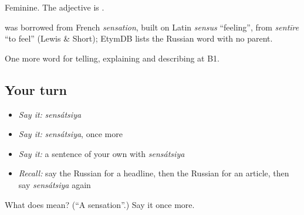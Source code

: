Feminine. The adjective is \emph{}.

\begin{cousinweb}
\emph{} was borrowed from French \emph{sensation}, built on Latin \emph{sensus} \textquotedblleft{}feeling\textquotedblright{}, from \emph{sentīre} \textquotedblleft{}to feel\textquotedblright{} (Lewis \& Short); EtymDB lists the Russian word with no parent.
\end{cousinweb}

\begin{grammarlens}[title={What you've built}]
One more word for telling, explaining and describing at B1.
\end{grammarlens}

\subsection*{Your turn}
\begin{itemize}
\raggedright
  \item \emph{Say it:} \emph{sensátsiya}
  \item \emph{Say it:} \emph{sensátsiya}, once more
  \item \emph{Say it:} a sentence of your own with \emph{sensátsiya}
  \item \emph{Recall:} say the Russian for a headline, then the Russian for an article, then say \emph{sensátsiya} again
\end{itemize}

\begin{tcolorbox}[breakable,colback=teal!4,colframe=teal!35!black,title={Before you move on}]
What does  mean? (\textquotedblleft{}A sensation\textquotedblright{}.) Say it once more.
\end{tcolorbox}
